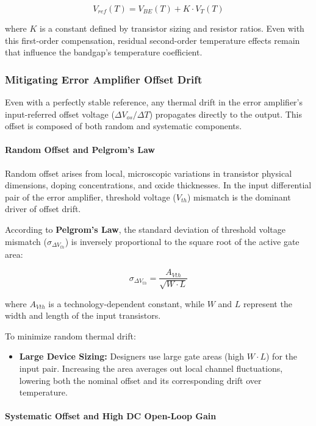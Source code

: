 \documentclass[
]{article}
\begin{document}
\[V_{ref}(T) = V_{BE}(T) + K \cdot V_T(T)\]

where \(K\) is a constant defined by transistor sizing and resistor
ratios. Even with this first-order compensation, residual second-order
temperature effects remain that influence the bandgap's temperature
coefficient.

\subsubsection{Mitigating Error Amplifier Offset
Drift}\label{_mitigating_error_amplifier_offset_drift}

Even with a perfectly stable reference, any thermal drift in the error
amplifier's input-referred offset voltage (\(\Delta V_{os}/\Delta T\))
propagates directly to the output. This offset is composed of both
random and systematic components.

\paragraph{Random Offset and Pelgrom's
Law}\label{_random_offset_and_pelgroms_law}

Random offset arises from local, microscopic variations in transistor
physical dimensions, doping concentrations, and oxide thicknesses. In
the input differential pair of the error amplifier, threshold voltage
(\(V_{th}\)) mismatch is the dominant driver of offset drift.

According to \textbf{Pelgrom's Law}, the standard deviation of threshold
voltage mismatch (\(\sigma_{\Delta V_{th}}\)) is inversely proportional
to the square root of the active gate area:

\[\sigma_{\Delta V_{th}} = \frac{A_{Vth}}{\sqrt{W \cdot L}}\]

where \(A_{Vth}\) is a technology-dependent constant, while \(W\) and
\(L\) represent the width and length of the input transistors.

To minimize random thermal drift:

\begin{itemize}
\item
  \textbf{Large Device Sizing:} Designers use large gate areas (high
  \(W \cdot L\)) for the input pair. Increasing the area averages out
  local channel fluctuations, lowering both the nominal offset and its
  corresponding drift over temperature.
\end{itemize}

\paragraph{Systematic Offset and High DC Open-Loop
Gain}\label{_systematic_offset_and_high_dc_open_loop_gain}
\end{document}
